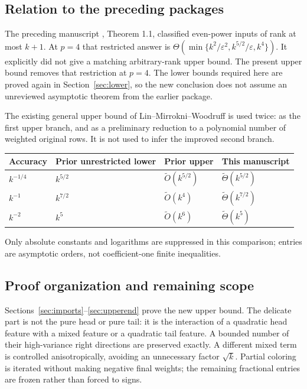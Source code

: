 \documentclass[11pt]{article}
\theoremstyle{remark}\newtheorem{remark}[theorem]{Remark}
\newcommand{\wt}{\widetilde}
\numberwithin{equation}{section}
\begin{document}
\subsection{Relation to the preceding packages}
The preceding manuscript \cite{prior}, Theorem 1.1, classified even-power inputs of rank at most $k+1$. At $p=4$ that restricted answer is
$\Theta(\min\{k^2/\varepsilon^2,k^{5/2}/\varepsilon,k^4\})$.
It explicitly did not give a matching arbitrary-rank upper bound. The present upper bound removes that restriction at $p=4$. The lower bounds required here are proved again in Section~\ref{sec:lower}, so the new conclusion does not assume an unreviewed asymptotic theorem from the earlier package.

The existing general upper bound of Lin--Mirrokni--Woodruff \cite[Theorem 1.2]{lmw} is used twice: as the first upper branch, and as a preliminary reduction to a polynomial number of weighted original rows. It is not used to infer the improved second branch.

\begin{center}
\begin{tabular}{@{}llll@{}}\toprule
Accuracy & Prior unrestricted lower & Prior upper & This manuscript\\\midrule
$k^{-1/4}$ & $k^{5/2}$ & $\wt O(k^{5/2})$ & $\wt\Theta(k^{5/2})$\\
$k^{-1}$ & $k^{7/2}$ & $\wt O(k^4)$ & $\wt\Theta(k^{7/2})$\\
$k^{-2}$ & $k^5$ & $\wt O(k^6)$ & $\wt\Theta(k^5)$\\\bottomrule
\end{tabular}
\end{center}
Only absolute constants and logarithms are suppressed in this comparison; entries are asymptotic orders, not coefficient-one finite inequalities.

\subsection{Proof organization and remaining scope}
Sections~\ref{sec:imports}--\ref{sec:upperend} prove the new upper bound. The delicate part is not the pure head or pure tail: it is the interaction of a quadratic head feature with a mixed feature or a quadratic tail feature. A bounded number of their high-variance right directions are preserved exactly. A different mixed term is controlled anisotropically, avoiding an unnecessary factor $\sqrt{k}$. Partial coloring is iterated without making negative final weights; the remaining fractional entries are frozen rather than forced to signs.
\end{document}
